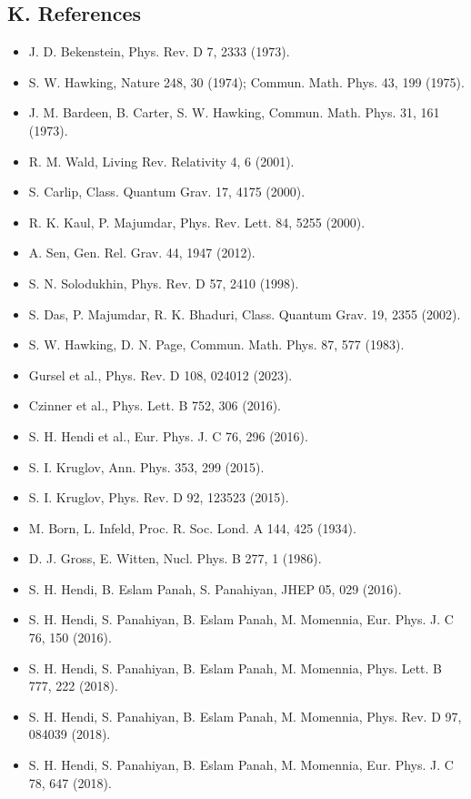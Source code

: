 \documentclass[12pt]{article}
\begin{document}
\subsection*{K. References}
\begin{itemize}
    \item J. D. Bekenstein, Phys. Rev. D 7, 2333 (1973).
    \item S. W. Hawking, Nature 248, 30 (1974); Commun. Math. Phys. 43, 199 (1975).
    \item J. M. Bardeen, B. Carter, S. W. Hawking, Commun. Math. Phys. 31, 161 (1973).
    \item R. M. Wald, Living Rev. Relativity 4, 6 (2001).
    \item S. Carlip, Class. Quantum Grav. 17, 4175 (2000).
    \item R. K. Kaul, P. Majumdar, Phys. Rev. Lett. 84, 5255 (2000).
    \item A. Sen, Gen. Rel. Grav. 44, 1947 (2012).
    \item S. N. Solodukhin, Phys. Rev. D 57, 2410 (1998).
    \item S. Das, P. Majumdar, R. K. Bhaduri, Class. Quantum Grav. 19, 2355 (2002).
    \item S. W. Hawking, D. N. Page, Commun. Math. Phys. 87, 577 (1983).
    \item Gursel et al., Phys. Rev. D 108, 024012 (2023).
    \item Czinner et al., Phys. Lett. B 752, 306 (2016).
    \item S. H. Hendi et al., Eur. Phys. J. C 76, 296 (2016).
    \item S. I. Kruglov, Ann. Phys. 353, 299 (2015).
    \item S. I. Kruglov, Phys. Rev. D 92, 123523 (2015).
    \item M. Born, L. Infeld, Proc. R. Soc. Lond. A 144, 425 (1934).
    \item D. J. Gross, E. Witten, Nucl. Phys. B 277, 1 (1986).
    \item S. H. Hendi, B. Eslam Panah, S. Panahiyan, JHEP 05, 029 (2016).
    \item S. H. Hendi, S. Panahiyan, B. Eslam Panah, M. Momennia, Eur. Phys. J. C 76, 150 (2016).
    \item S. H. Hendi, S. Panahiyan, B. Eslam Panah, M. Momennia, Phys. Lett. B 777, 222 (2018).
    \item S. H. Hendi, S. Panahiyan, B. Eslam Panah, M. Momennia, Phys. Rev. D 97, 084039 (2018).
    \item S. H. Hendi, S. Panahiyan, B. Eslam Panah, M. Momennia, Eur. Phys. J. C 78, 647 (2018).

\end{itemize}
\end{document}

